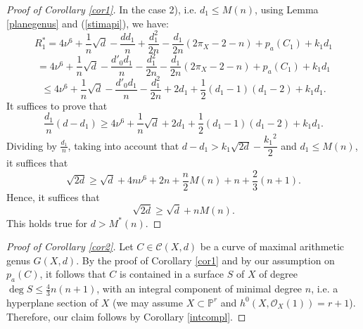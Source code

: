 \documentclass[9pt,a4paper]{amsart}
\theoremstyle{plain}
\theoremstyle{definition}
\theoremstyle{remark}
\begin{document}
\begin{proof}[Proof of Corollary \ref{cor1}]
\smallskip
In the case 2), i.e. $d_1\leq M(n)$, using Lemma \ref{planegenus} and (\ref{stimapi}),
we have:
$$
R^*_1=4\nu^6+\frac{1}{n}\sqrt{d}-\frac{dd_1}{n}+\frac{d_1^2}{2n}-\frac{d_1}{2n}(2\pi_X-2-n)+p_a(C_1)+k_1d_1
$$
$$
=4\nu^6+\frac{1}{n}\sqrt{d}-\frac{d'_0d_1}{n}-\frac{d_1^2}{2n}-\frac{d_1}{2n}(2\pi_X-2-n)+p_a(C_1)+k_1d_1
$$
$$
\leq
4\nu^6+\frac{1}{n}\sqrt{d}-\frac{d'_0d_1}{n}-\frac{d_1^2}{2n}+2d_1+\frac{1}{2}(d_1-1)(d_1-2)+k_1d_1.
$$
It suffices to prove that
$$
\frac{d_1}{n}(d-d_1)\geq
4\nu^6+\frac{1}{n}\sqrt{d}+2d_1+\frac{1}{2}(d_1-1)(d_1-2)+k_1d_1.
$$
Dividing by $\frac{d_1}{n}$, taking into account that
$d-d_1>k_1\sqrt{2d}-\dfrac{{k_1}^2}{2}$ and $d_1\leq M(n)$, it
suffices that
$$
\sqrt{2d}\geq
\sqrt{d}+4n\nu^6+2n+\frac{n}{2}M(n)+n+\frac{2}{3}(n+1).
$$
Hence, it suffices that
$$
\sqrt{2d}\geq \sqrt{d}+nM(n).
$$
This holds true for $d>M^*(n)$.
\end{proof}



\smallskip
\begin{proof}[Proof of Corollary \ref{cor2}] Let $C\in \mathcal C(X,d)$
be a curve of maximal arithmetic genus $G(X,d)$. By the proof of
Corollary \ref{cor1} and by our assumption on $p_a(C)$, it follows
that $C$ is contained in a surface $S$ of $X$ of degree $\deg S\leq
\frac{4}{3}n(n+1)$, with an integral component of minimal degree
$n$, i.e. a hyperplane section of $X$ (we may assume $X\subset
\mathbb P^r$ and  $h^0(X,\mathcal O_X(1))=r+1$). Therefore, our
claim follows by Corollary \ref{intcompl}.
\end{proof}
\end{document}
